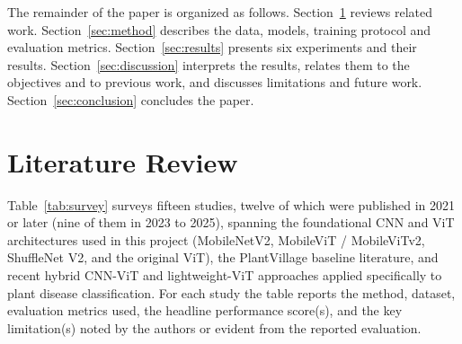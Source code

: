 \documentclass[conference]{IEEEtran}
\begin{document}
The remainder of the paper is organized as follows. Section~\ref{sec:lit} reviews related work. Section~\ref{sec:method} describes the data, models, training protocol and evaluation metrics. Section~\ref{sec:results} presents six experiments and their results. Section~\ref{sec:discussion} interprets the results, relates them to the objectives and to previous work, and discusses limitations and future work. Section~\ref{sec:conclusion} concludes the paper.


\section{Literature Review}
\label{sec:lit}

Table~\ref{tab:survey} surveys fifteen studies, twelve of which were published in 2021 or later (nine of them in 2023 to 2025), spanning the foundational CNN and ViT architectures used in this project (MobileNetV2, MobileViT / MobileViTv2, ShuffleNet V2, and the original ViT), the PlantVillage baseline literature, and recent hybrid CNN-ViT and lightweight-ViT approaches applied specifically to plant disease classification. For each study the table reports the method, dataset, evaluation metrics used, the headline performance score(s), and the key limitation(s) noted by the authors or evident from the reported evaluation.
\end{document}
